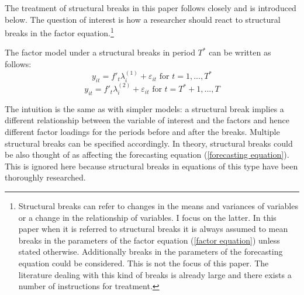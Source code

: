 \documentclass[12pt]{article}
\begin{document}
The treatment of structural breaks in this paper follows \citet{breitung2011testing} closely and is introduced below. The question of interest is how a researcher should react to structural breaks in the factor equation.\footnote{Structural breaks can refer to changes in the means and variances of variables or a change in the relationship of variables. I focus on the latter. In this paper when it is referred to structural breaks it is always assumed to mean breaks in the parameters of the factor equation (\ref{factor equation}) unless stated otherwise. Additionally breaks in the parameters of the forecasting equation could be considered. This is not the focus of this paper. The literature dealing with this kind of breaks is already large and there exists a number of instructions for treatment.}

The factor model under a structural breaks in period $T^*$ can be written as follows:
\begin{equation}
	\label{}
	y_{it} = f'_t\lambda_i^{(1)} + \varepsilon_{it} \text{ for } t = 1, ..., T^*
\end{equation}
\begin{equation}
	\label{}
	y_{it} = f'_t\lambda_i^{(2)} + \varepsilon_{it} \text{ for } t = T^* + 1, ..., T
\end{equation}

The intuition is the same as with simpler models: a structural break implies a different relationship between the variable of interest and the factors and hence different factor loadings for the periods before and after the breaks. Multiple structural breaks can be specified accordingly. In theory, structural breaks could be also thought of as affecting the forecasting equation (\ref{forecasting equation}). This is ignored here because structural breaks in equations of this type have been thoroughly researched.
\end{document}
